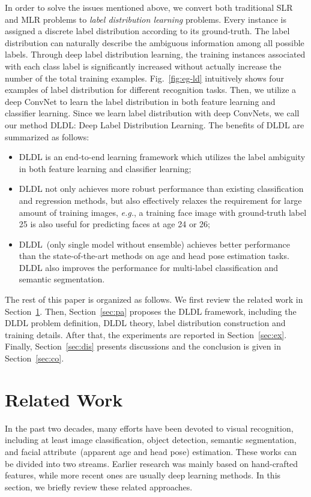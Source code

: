 \documentclass[journal]{IEEEtran}
\begin{document}
In order to solve the issues mentioned above, we convert both traditional SLR and MLR problems to \emph{label distribution learning} problems. Every instance is assigned a discrete label distribution  according to its ground-truth. The label distribution can naturally describe the ambiguous information among all possible labels. Through deep label distribution learning, the training instances associated with each class label is significantly increased without actually increase the number of the total training examples. Fig.~\ref{fig:eg-ld} intuitively shows four examples of label distribution for different recognition tasks. Then, we utilize a deep ConvNet to learn the label distribution in both feature learning and classifier learning. Since we learn label distribution with deep ConvNets, we call our method DLDL: Deep Label Distribution Learning. The benefits of DLDL are summarized as follows:
\begin{itemize}
\item DLDL is an end-to-end learning framework which utilizes the label ambiguity in both feature learning and classifier learning;
\item DLDL not only achieves more robust performance than existing classification and regression methods, but also effectively relaxes the requirement for large amount of training images, \emph{e.g.}, a training face image with ground-truth label 25 is also useful for predicting faces at age 24 or 26;
\item DLDL~(only single model without ensemble) achieves better performance than the state-of-the-art methods on age and head pose estimation tasks. DLDL also improves the performance for multi-label classification and semantic segmentation.
\end{itemize}

The rest of this paper is organized as follows. We first review the related work in Section~\ref{sec:rw}. Then, Section~\ref{sec:pa} proposes the DLDL framework, including the DLDL problem definition, DLDL theory, label distribution construction and training details. After that, the experiments are reported in Section~\ref{sec:ex}. Finally, Section~\ref{sec:dis} presents discussions and the conclusion is given in Section~\ref{sec:co}.

\section{Related Work}\label{sec:rw}

In the past two decades, many efforts have been devoted to visual recognition, including at least image classification, object detection, semantic segmentation, and facial attribute~(apparent age and head pose) estimation. These works can be divided into two streams. Earlier research was mainly based on hand-crafted features, while more recent ones are usually deep learning methods. In this section, we briefly review these related approaches.
\end{document}
